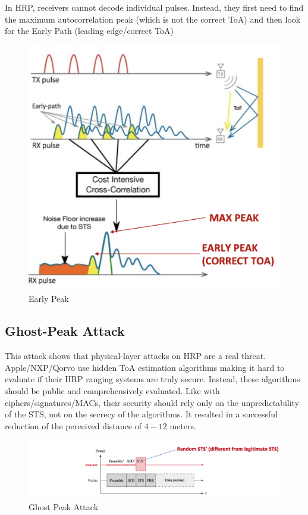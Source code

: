 In HRP, receivers cannot decode individual pulses. Instead, they first need to find the maximum autocorrelation peak (which is not the correct ToA) and then look for the Early Path (leading edge/correct ToA)
\begin{figure}[h]
	\centering
	\includegraphics[scale=0.3]{images/5-early-peak.png}
	\caption{Early Peak}%
	\label{fig:earlypeak}
\end{figure}

\subsection{Ghost-Peak Attack}
This attack shows that physical-layer attacks on HRP are a real threat. Apple/NXP/Qorvo use hidden ToA estimation algorithms making it hard to evaluate if their HRP ranging systems are truly secure. Instead, these algorithms should be public and comprehensively evaluated.
Like with ciphers/signatures/MACs, their security should rely only on the unpredictability of the STS, not on the secrecy of the algorithms.
It resulted in a successful reduction of the perceived distance of $4-12$ meters.

\begin{figure}[h]
	\centering
	\includegraphics[scale=0.45]{images/5-ghost-peak.png}
	\caption{Ghost Peak Attack}%
	\label{fig:ghostpeak}
\end{figure}

